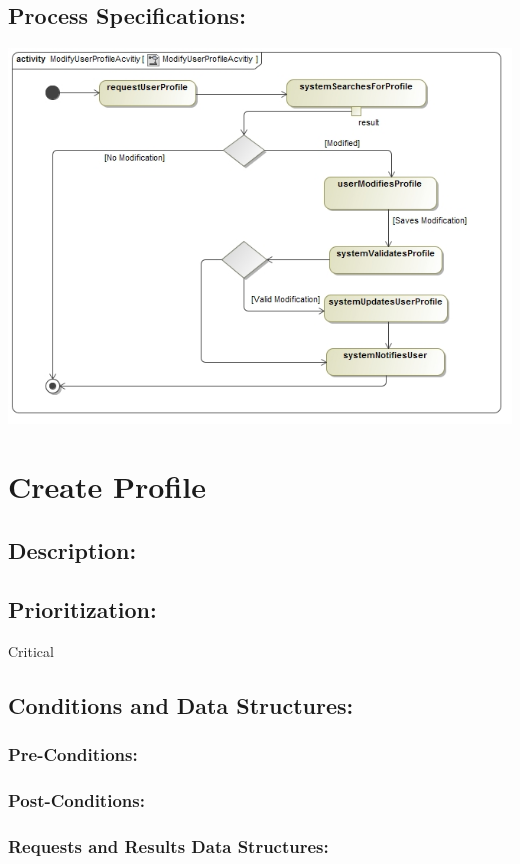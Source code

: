 \documentclass[a4paper,11pt]{article}
\begin{document}
\subsection{Process Specifications:} 
\includegraphics{Images/UserProfile/ModifyUserProfileAcvitiy}

\section{Create Profile}
\subsection*{Description:}
\subsection{Prioritization:} 
\textbf{}Critical
\subsection{Conditions and Data Structures:}
\subsubsection*{Pre-Conditions:}
\subsubsection*{Post-Conditions:}
\subsubsection*{Requests and Results Data Structures:}
\end{document}
